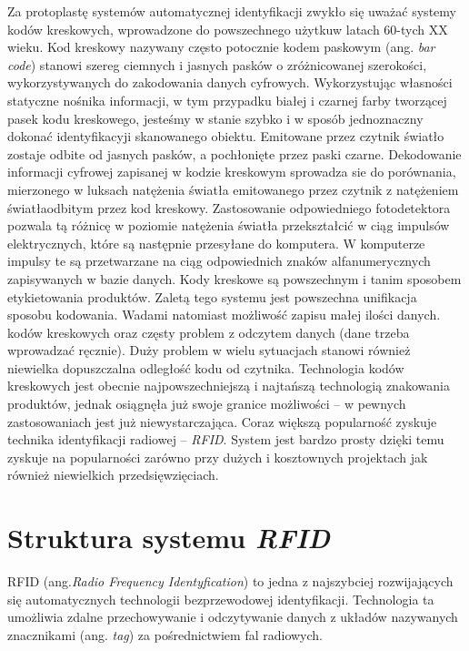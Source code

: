 Za protoplastę systemów automatycznej identyfikacji zwykło się uważać systemy kodów kreskowych, wprowadzone do powszechnego użytkuw latach 60-tych XX wieku.
Kod kreskowy nazywany często potocznie kodem paskowym (ang. \emph{bar code}) stanowi szereg ciemnych i jasnych pasków o zróżnicowanej szerokości, wykorzystywanych do zakodowania danych cyfrowych. Wykorzystując własności statyczne nośnika informacji, w tym przypadku białej i czarnej farby tworzącej pasek kodu kreskowego, jesteśmy w stanie szybko i w sposób jednoznaczny dokonać identyfikacyji skanowanego obiektu. Emitowane przez czytnik światło zostaje odbite od jasnych pasków, a pochłonięte przez paski czarne. Dekodowanie informacji cyfrowej zapisanej w kodzie kreskowym sprowadza sie do porównania, mierzonego w luksach natężenia światła emitowanego przez czytnik z natężeniem światłaodbitym przez kod kreskowy. Zastosowanie odpowiedniego fotodetektora pozwala tą różnicę w poziomie natężenia światła przekształcić w ciąg impulsów elektrycznych, które są następnie przesyłane do komputera. W komputerze impulsy te są przetwarzane na ciąg odpowiednich znaków alfanumerycznych zapisywanych w bazie danych. 
Kody kreskowe są powszechnym i tanim sposobem etykietowania produktów. Zaletą tego systemu jest powszechna unifikacja sposobu kodowania. Wadami  natomiast możliwość zapisu małej ilości danych. kodów kreskowych oraz częsty problem z odczytem danych (dane trzeba wprowadzać ręcznie). Duży problem w wielu sytuacjach stanowi również niewielka dopuszczalna odległość kodu od czytnika. 
Technologia kodów kreskowych jest obecnie najpowszechniejszą i najtańszą technologią znakowania produktów, jednak osiągnęła już swoje granice możliwości – w pewnych zastosowaniach jest już niewystarczająca.
Coraz większą popularność zyskuje technika identyfikacji radiowej – \emph{RFID}. System jest bardzo prosty dzięki temu zyskuje na popularności zarówno przy dużych i kosztownych projektach jak również  niewielkich przedsięwzięciach.

\newpage

\section{Struktura systemu \emph{RFID}}

RFID (ang.\emph {Radio Frequency  Identyfication}) to jedna z najszybciej rozwijających  się automatycznych technologii bezprzewodowej  identyfikacji. Technologia ta umożliwia zdalne przechowywanie i odczytywanie danych z układów nazywanych znacznikami (ang. \emph{tag}) za pośrednictwiem fal radiowych. 

